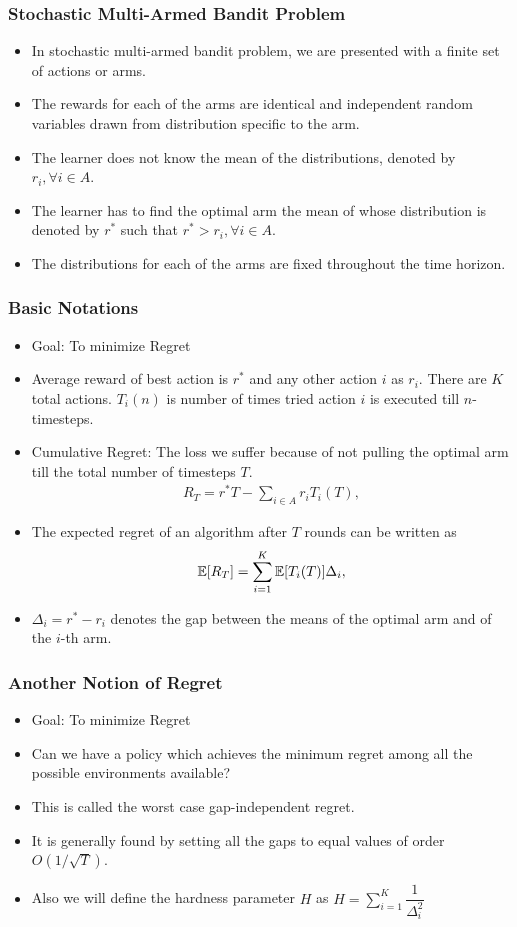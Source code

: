 \begin{frame}
\frametitle{Stochastic Multi-Armed Bandit Problem}
\begin{itemize}
\item<1-> In stochastic multi-armed bandit problem, we are presented with a finite set of actions or arms. 
\item<2-> The rewards for each of the arms are identical and independent random variables drawn from distribution specific to the arm.
\item<3-> The learner does not know the mean of the distributions, denoted by $r_{i},\forall i\in A$. 
\item<4-> The learner has to find the optimal arm the mean of whose distribution is denoted by $r^{*}$ such that $r^{*}> r_{i}, \forall i\in A$.
\item<5-> The distributions for each of the arms are fixed throughout the time horizon. 
\end{itemize}
\end{frame}

\begin{frame}
\frametitle{Basic Notations}
\begin{itemize}
\item<1-> Goal: To minimize Regret
\item<2-> Average reward of best action is $r^{*}$ and any other action $i$ as $r_{i}$. There are $K$ total actions. $T_{i}(n)$ is number of times tried action $i$ is executed till $n$-timesteps.
\item<3-> Cumulative Regret: The loss we suffer because of not pulling the optimal arm till the total number of timesteps  $T$. 
\begin{align*}
R_{T}=r^{*}T - \sum_{i\in A} r_{i}T_{i}(T),
\end{align*}
\item<4-> The expected regret of an algorithm after $T$ rounds can be written as
\begin{align*}
\mathbb{E}[R_{T}]= \sum_{i=1}^K \mathbb{E}[T_{i}(T)] \Delta_i,
\end{align*}
\item<4-> $\Delta_{i}=r^{*}-r_{i}$ denotes the gap between the means of the optimal arm and of the $i$-th arm. 
\end{itemize}
\end{frame}

\begin{frame}
\frametitle{Another Notion of Regret}
\begin{itemize}
\item<1-> Goal: To minimize Regret
\item<2-> Can we have a policy which achieves the minimum regret among all the possible environments available?
\item<3-> This is called the worst case gap-independent regret.
\item<4-> It is generally found by setting all the gaps to equal values of order $O\left( 1/\sqrt{T} \right)$.
\item<5-> Also we will define the hardness parameter $H$ as $H=\sum_{i=1}^{K}\dfrac{1}{\Delta_{i}^2}$
\end{itemize}
\end{frame}